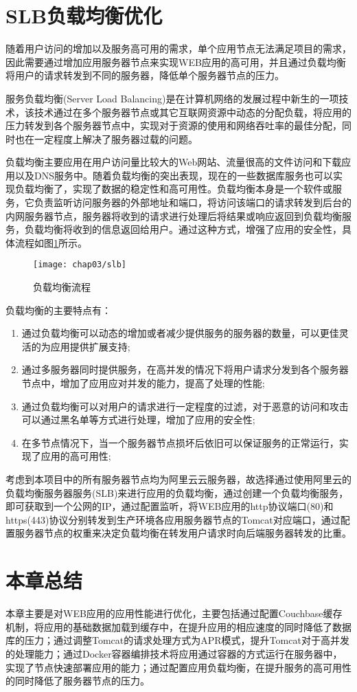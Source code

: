 \section{SLB负载均衡优化}

随着用户访问的增加以及服务高可用的需求，单个应用节点无法满足项目的需求，因此需要通过增加应用服务器节点来实现WEB应用的高可用，并且通过负载均衡将用户的请求转发到不同的服务器，降低单个服务器节点的压力。

服务负载均衡(Server Load Balancing)是在计算机网络的发展过程中新生的一项技术，该技术通过在多个服务器节点或其它互联网资源中动态的分配负载，将应用的压力转发到各个服务器节点中，实现对于资源的使用和网络吞吐率的最佳分配，同时也在一定程度上解决了服务器过载的问题\cite{负载均衡计算机}。

负载均衡主要应用在用户访问量比较大的Web网站、流量很高的文件访问和下载应用以及DNS服务中。随着负载均衡的突出表现，现在的一些数据库服务也可以实现负载均衡了，实现了数据的稳定性和高可用性。负载均衡本身是一个软件或服务，它负责监听访问服务器的外部地址和端口，将访问该端口的请求转发到后台的内网服务器节点，服务器将收到的请求进行处理后将结果或响应返回到负载均衡服务，负载均衡将收到的信息返回给用户\cite{wei2010system}。通过这种方式，增强了应用的安全性，具体流程如图\ref{fig:slb}所示。

\begin{figure}[H] %
  \centering
  \texttt{[image: chap03/slb]}
  \caption{负载均衡流程}
  \label{fig:slb}
\end{figure}

负载均衡的主要特点有：
\begin{enumerate}
\item 通过负载均衡可以动态的增加或者减少提供服务的服务器的数量，可以更佳灵活的为应用提供扩展支持;
\item 通过多服务器同时提供服务，在高并发的情况下将用户请求分发到各个服务器节点中，增加了应用应对并发的能力，提高了处理的性能;
\item 通过负载均衡可以对用户的请求进行一定程度的过滤，对于恶意的访问和攻击可以通过黑名单等方式进行处理，增加了应用的安全性;
\item 在多节点情况下，当一个服务器节点损坏后依旧可以保证服务的正常运行，实现了应用的高可用性;
\end{enumerate}

考虑到本项目中的所有服务器节点均为阿里云云服务器，故选择通过使用阿里云的负载均衡服务器服务(SLB)来进行应用的负载均衡，通过创建一个负载均衡服务，即可获取到一个公网的IP，通过配置监听，将WEB应用的http协议端口(80)和https(443)协议分别转发到生产环境各应用服务器节点的Tomcat对应端口，通过配置服务器节点的权重来决定负载均衡在转发用户请求时向后端服务器转发的比重。

\section{本章总结}
本章主要是对WEB应用的应用性能进行优化，主要包括通过配置Couchbase缓存机制，将应用的基础数据加载到缓存中，在提升应用的相应速度的同时降低了数据库的压力；通过调整Tomcat的请求处理方式为APR模式，提升Tomcat对于高并发的处理能力；通过Docker容器编排技术将应用通过容器的方式运行在服务器中，实现了节点快速部署应用的能力；通过配置应用负载均衡，在提升服务的高可用性的同时降低了服务器节点的压力。

